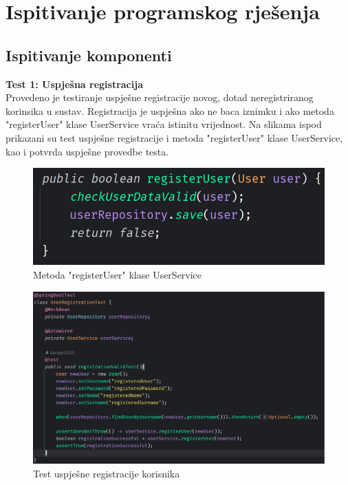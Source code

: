 		\section{Ispitivanje programskog rješenja}
			
			\subsection{Ispitivanje komponenti}
\textbf{Test 1: Uspješna registracija} \\
Provedeno je testiranje uspješne registracije novog, dotad neregistriranog korinsika u sustav. Registracija je uspješna ako ne baca iznimku i ako metoda "registerUser" klase UserService vraća istinitu vrijednost. Na slikama ispod prikazani su test uspješne registracije i metoda "registerUser" klase UserService, kao i potvrda uspješne provedbe testa.

		\begin{figure}[H]
			\includegraphics[scale=0.4]{slike/registerUser.PNG} %
			\centering
			\caption{Metoda "registerUser" klase UserService}
			\label{Metoda "registerUser" klase UserService}
		\end{figure}
		
				\begin{figure}[H]
			\includegraphics[scale=0.4]{slike/userRegistrationTest.PNG} %
			\centering
			\caption{Test uspješne registracije korisnika}
			\label{Test uspješne registracije korisnika}
		\end{figure}
		
